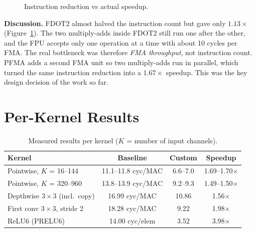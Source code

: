 \begin{figure}[h]
\centering
{}
\caption{Instruction reduction vs actual speedup.}
\label{fig:insight}
\end{figure}

\textbf{Discussion.} FDOT2 almost halved the instruction count but gave only
$1.13\times$ (Figure~\ref{fig:insight}). The two multiply-adds inside FDOT2
still run one after the other, and the FPU accepts only one operation at a
time with about 10 cycles per FMA. The real bottleneck was therefore
\emph{FMA throughput}, not instruction count. PFMA adds a second FMA unit so
two multiply-adds run in parallel, which turned the same instruction
reduction into a $1.67\times$ speedup. This was the key design decision of
the work so far.

\section{Per-Kernel Results}

\begin{table}[h]
\centering
\begin{tabular}{lccc}\toprule
Kernel & Baseline & Custom & Speedup\\\midrule
Pointwise, $K$ = 16--144 & 11.1--11.8 cyc/MAC & 6.6--7.0 & 1.69--1.70$\times$\\
Pointwise, $K$ = 320--960 & 13.8--13.9 cyc/MAC & 9.2--9.3 & 1.49--1.50$\times$\\
Depthwise $3\times3$ (incl.\ copy) & 16.99 cyc/MAC & 10.86 & 1.56$\times$\\
First conv $3\times3$, stride 2 & 18.28 cyc/MAC & 9.22 & 1.98$\times$\\
ReLU6 (PRELU6) & 14.00 cyc/elem & 3.52 & 3.98$\times$\\\bottomrule
\end{tabular}
\caption{Measured results per kernel ($K$ = number of input channels).}
\label{tab:kernels}
\end{table}

